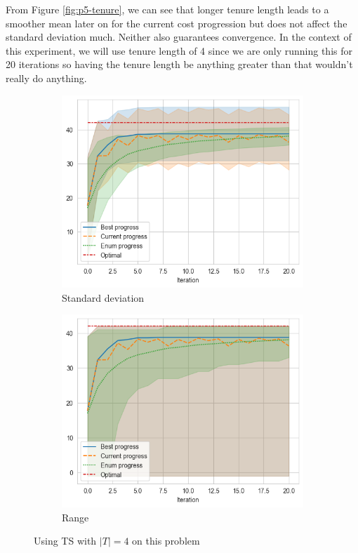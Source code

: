 From Figure \ref{fig:p5-tenure}, we can see that longer tenure length leads to a smoother mean later on for the current cost progression but does not affect the standard deviation much. Neither also guarantees convergence. In the context of this experiment, we will use tenure length of 4 since we are only running this for 20 iterations so having the tenure length be anything greater than that wouldn't really do anything.

\begin{figure}[ht]
    \centering
    \hfill
    \begin{subfigure}{0.45\textwidth}
        \includegraphics[width=\textwidth]{../images/p5/sd}
        \caption{Standard deviation}
    \end{subfigure}
    \hfill
    \begin{subfigure}{0.45\textwidth}
        \includegraphics[width=\textwidth]{../images/p5/pi}
        \caption{Range}
    \end{subfigure}
    \hfill

    \caption{Using TS with \(|T|=4\) on this problem}
    \label{fig:p5-ts}
\end{figure}

